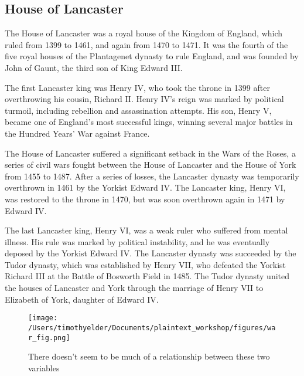 \documentclass[11pt,article,oneside]{memoir}
\begin{document}
\hypertarget{house-of-lancaster}{%
\subsection{House of Lancaster}\label{house-of-lancaster}}

The House of Lancaster was a royal house of the Kingdom of England,
which ruled from 1399 to 1461, and again from 1470 to 1471. It was the
fourth of the five royal houses of the Plantagenet dynasty to rule
England, and was founded by John of Gaunt, the third son of King Edward
III.

The first Lancaster king was Henry IV, who took the throne in 1399 after
overthrowing his cousin, Richard II. Henry IV's reign was marked by
political turmoil, including rebellion and assassination attempts. His
son, Henry V, became one of England's most successful kings, winning
several major battles in the Hundred Years' War against France.

The House of Lancaster suffered a significant setback in the Wars of the
Roses, a series of civil wars fought between the House of Lancaster and
the House of York from 1455 to 1487. After a series of losses, the
Lancaster dynasty was temporarily overthrown in 1461 by the Yorkist
Edward IV. The Lancaster king, Henry VI, was restored to the throne in
1470, but was soon overthrown again in 1471 by Edward IV.

The last Lancaster king, Henry VI, was a weak ruler who suffered from
mental illness. His rule was marked by political instability, and he was
eventually deposed by the Yorkist Edward IV. The Lancaster dynasty was
succeeded by the Tudor dynasty, which was established by Henry VII, who
defeated the Yorkist Richard III at the Battle of Bosworth Field in
1485. The Tudor dynasty united the houses of Lancaster and York through
the marriage of Henry VII to Elizabeth of York, daughter of Edward IV.

\begin{figure}
\hypertarget{fig:example_fig}{%
\centering
\texttt{[image: /Users/timothyelder/Documents/plaintext\_workshop/figures/war\_fig.png]}
\caption{There doesn't seem to be much of a relationship between these
two variables}\label{fig:example_fig}
}
\end{figure}
\end{document}
